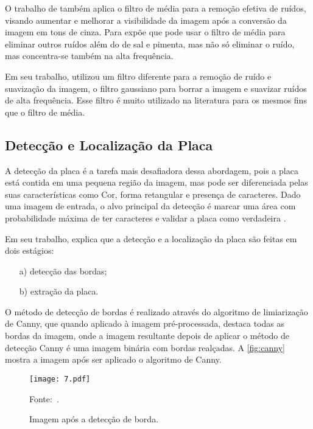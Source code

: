 O trabalho de  também aplica o filtro de média para a remoção efetiva de ruídos, visando aumentar e melhorar a visibilidade da imagem após a conversão da imagem em tons de cinza. Para  expõe que pode usar o filtro de média para eliminar outros ruídos além do de sal e pimenta, mas não só eliminar o ruído, mas concentra-se também na alta frequência.

Em seu trabalho,  utilizou um filtro diferente para a remoção de ruído e suavização da imagem, o filtro gaussiano para borrar a imagem e suavizar ruídos de alta frequência. Esse filtro é muito utilizado na literatura para os mesmos fins que o filtro de média.   

\subsection{\textbf{Detecção e Localização da Placa}}

A detecção da placa é a tarefa mais desafiadora dessa abordagem, pois a placa está contida em uma pequena região da imagem, mas pode ser diferenciada pelas suas características como Cor, forma retangular e presença de caracteres. Dado uma imagem de entrada, o alvo principal da detecção é marcar uma área com probabilidade máxima de ter caracteres e validar a placa como verdadeira \cite{agarwal2016}.

Em seu trabalho, \cite{agarwal2016} explica que a detecção e a localização da placa são feitas em dois estágios:

\begin{itemize}
	\item[a)] detecção das bordas;
	\item[b)] extração da placa.
\end{itemize}

O método de detecção de bordas é realizado através do algoritmo de limiarização de Canny, que quando aplicado à imagem pré-processada, destaca todas as bordas da imagem, onde a imagem resultante depois de aplicar o método de detecção Canny é uma imagem binária com bordas realçadas. A \autoref{fig:canny} mostra a imagem após ser aplicado o algoritmo de Canny.

\begin{figure}[htb]
	\centering
	\caption{{\footnotesize Imagem após a detecção de borda.}}   %
	\label{fig:canny}
	\texttt{[image: 7.pdf]}
	
	{\footnotesize Fonte:~.}
\end{figure}

